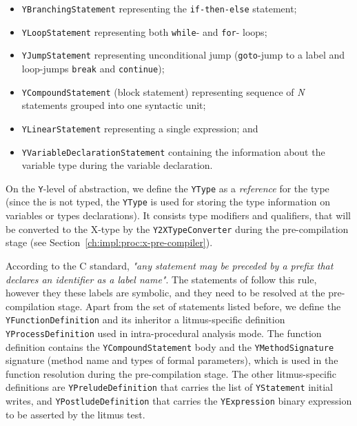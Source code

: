 \begin{itemize}%
  \item \texttt{YBranchingStatement} representing the \texttt{if-then-else} statement;
  
  \item \texttt{YLoopStatement} representing both \texttt{while}- and \texttt{for}- loops;
  
  \item \texttt{YJumpStatement} representing unconditional jump (\texttt{goto}-jump to a label and loop-jumps \texttt{break} and \texttt{continue});
  
  \item \texttt{YCompoundStatement} (block statement) representing sequence of \textit{N} statements grouped into one syntactic unit;
  
  \item \texttt{YLinearStatement} representing a single expression; and
  
  \item \texttt{YVariableDeclarationStatement} containing the information about the variable type during the variable declaration.
\end{itemize}

On the \texttt{Y}-level of abstraction, we define the \texttt{YType} as a \textit{reference} for the type (since the \ytree{} is not typed, the \texttt{YType} is used for storing the type information on variables or types declarations).
It consists type modifiers and qualifiers, that will be converted to the X-type by the \texttt{Y2XTypeConverter} during the pre-compilation stage (see Section~\ref{ch:impl:proc:x-pre-compiler}).

According to the C standard, \textit{"any statement may be preceded by a prefix that declares an identifier as a label name"}.
The \ytree{} statements of follow this rule, however they these labels are symbolic, and they need to be resolved at the pre-compilation stage.
Apart from the set of statements listed before, we define the \texttt{YFunctionDefinition} and its inheritor a litmus-specific definition \texttt{YProcessDefinition}
used in intra-procedural analysis mode.
The function definition contains the \texttt{YCompoundStatement} body and the \texttt{YMethodSignature} signature (method name and types of formal parameters), which is used in the function resolution during the pre-compilation stage.
The other litmus-specific definitions are \texttt{YPreludeDefinition}
that carries the list of \texttt{YStatement} initial writes, and \texttt{YPostludeDefinition} 
that carries the \texttt{YExpression} binary expression to be asserted by the litmus test.

